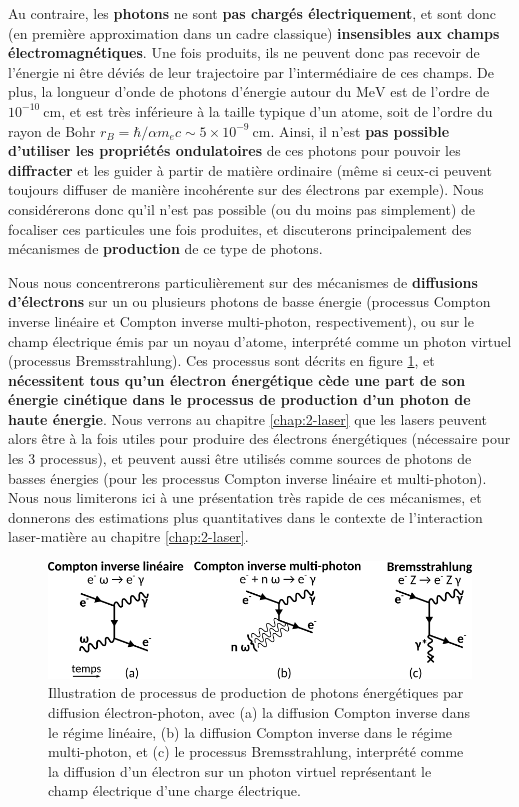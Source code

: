 \begin{refsection}
Au contraire, les \textbf{photons} ne sont \textbf{pas chargés électriquement}, et sont donc (en première approximation dans un cadre classique) \textbf{insensibles aux champs électromagnétiques}. Une fois produits, ils ne peuvent donc pas recevoir de l'énergie ni être déviés de leur trajectoire par l'intermédiaire de ces champs. De plus, la longueur d'onde de photons d'énergie autour du $\si{\MeV}$ est de l'ordre de $10^{-10} ~ \si{\cm}$, et est très inférieure à la taille typique d'un atome, soit de l'ordre du rayon de Bohr $r_B = \hbar/\alpha m_e c \sim 5 \times 10^{-9} ~ \si{\cm}$. Ainsi, il n'est \textbf{pas possible d'utiliser les propriétés ondulatoires} de ces photons pour pouvoir les \textbf{diffracter} et les guider à partir de matière ordinaire (même si ceux-ci peuvent toujours diffuser de manière incohérente sur des électrons par exemple). Nous considérerons donc qu'il n'est pas possible (ou du moins pas simplement) de focaliser ces particules une fois produites, et discuterons principalement des mécanismes de \textbf{production} de ce type de photons. 

Nous nous concentrerons particulièrement sur des mécanismes de \textbf{diffusions d'électrons} sur un ou plusieurs photons de basse énergie (processus Compton inverse linéaire et Compton inverse multi-photon, respectivement), ou sur le champ électrique émis par un noyau d'atome, interprété comme un photon virtuel (processus Bremsstrahlung). Ces processus sont décrits en figure \ref{fig:12-diagrammes_gamma}, et \textbf{nécessitent tous qu'un électron énergétique cède une part de son énergie cinétique dans le processus de production d'un photon de haute énergie}. Nous verrons au chapitre \ref{chap:2-laser} que les lasers peuvent alors être à la fois utiles pour produire des électrons énergétiques (nécessaire pour les 3 processus), et peuvent aussi être utilisés comme sources de photons de basses énergies (pour les processus Compton inverse linéaire et multi-photon). 
Nous nous limiterons ici à une présentation très rapide de ces mécanismes, et donnerons des estimations plus quantitatives dans le contexte de l'interaction laser-matière au chapitre \ref{chap:2-laser}. 

\begin{figure}[hbtp]
	\centering
	\includegraphics[width=\linewidth]{1-particules/QED_gamma.png}
	\caption{Illustration de processus de production de photons énergétiques par diffusion électron-photon, avec (a) la diffusion Compton inverse dans le régime linéaire, (b) la diffusion Compton inverse dans le régime multi-photon, et (c) le processus Bremsstrahlung, interprété comme la diffusion d'un électron sur un photon virtuel représentant le champ électrique d'une charge électrique.}
	\label{fig:12-diagrammes_gamma}
\end{figure}


\end{refsection}
